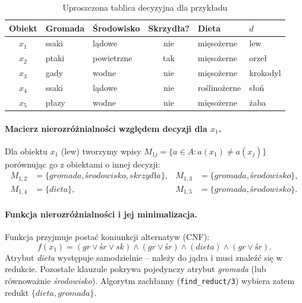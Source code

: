 \documentclass[11pt,a4paper]{article}
\newcommand{\code}[1]{\texttt{#1}}
\begin{document}
\begin{table}[h]
\centering
\caption{Uproszczona tablica decyzyjna dla przykładu}
\label{tab:dt2}
\small
\renewcommand{\arraystretch}{1.2}
\begin{tabular}{c l l c l l}
\toprule
\textbf{Obiekt} & \textbf{Gromada} & \textbf{Środowisko} & \textbf{Skrzydła?} & \textbf{Dieta} & \textbf{$d$} \\
\midrule
$x_1$ & ssaki & lądowe      & nie & mięsożerne   & lew \\
$x_2$ & ptaki & powietrzne  & tak & mięsożerne   & orzeł \\
$x_3$ & gady  & wodne       & nie & mięsożerne   & krokodyl \\
$x_4$ & ssaki & lądowe      & nie & roślinożerne & słoń \\
$x_5$ & płazy & wodne       & nie & mięsożerne   & żaba \\
\bottomrule
\end{tabular}
\end{table}

\paragraph{Macierz nierozróżnialności względem decyzji dla $x_1$.}
Dla obiektu $x_1$ (lew) tworzymy wpisy $M_{1j}=\{a\in A: a(x_1)\ne a(x_j)\}$
porównując go z obiektami o innej decyzji:
\begin{align*}
M_{1,2} &= \{\textit{gromada}, \textit{środowisko}, \textit{skrzydła}\}, &
M_{1,3} &= \{\textit{gromada}, \textit{środowisko}\}, \\
M_{1,4} &= \{\textit{dieta}\}, &
M_{1,5} &= \{\textit{gromada}, \textit{środowisko}\}.
\end{align*}

\paragraph{Funkcja nierozróżnialności i jej minimalizacja.}
Funkcja przyjmuje postać koniunkcji alternatyw (CNF):
\[
f(x_1) = (\textit{gr}\vee\textit{śr}\vee\textit{sk}) \wedge (\textit{gr}\vee\textit{śr}) \wedge (\textit{dieta}) \wedge (\textit{gr}\vee\textit{śr}).
\]
Atrybut \textit{dieta} występuje samodzielnie -- należy do jądra i musi znaleźć
się w redukcie. Pozostałe klauzule pokrywa pojedynczy atrybut \textit{gromada}
(lub równoważnie \textit{środowisko}). Algorytm zachłanny
(\code{find\_reduct/3}) wybiera zatem redukt $\{\textit{dieta}, \textit{gromada}\}$.
\end{document}
